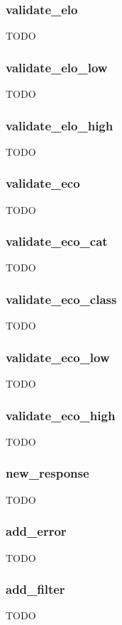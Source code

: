 \documentclass{article}
\begin{document}
\subsubsection*{validate\_elo}
TODO

\subsubsection*{validate\_elo\_low}
TODO

\subsubsection*{validate\_elo\_high}
TODO

\subsubsection*{validate\_eco}
TODO

\subsubsection*{validate\_eco\_cat}
TODO

\subsubsection*{validate\_eco\_class}
TODO

\subsubsection*{validate\_eco\_low}
TODO

\subsubsection*{validate\_eco\_high}
TODO

\subsubsection*{new\_response}
TODO

\subsubsection*{add\_error}
TODO

\subsubsection*{add\_filter}
TODO
\end{document}
